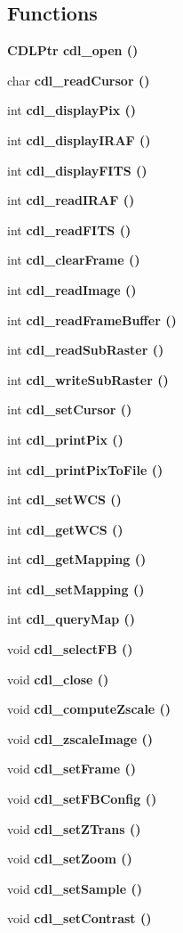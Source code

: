 \subsection*{Functions}
\begin{CompactItemize}
\item 
\bf{CDLPtr} \bf{cdl\_\-open} ()
\item 
char \bf{cdl\_\-read\-Cursor} ()
\item 
int \bf{cdl\_\-display\-Pix} ()
\item 
int \bf{cdl\_\-display\-IRAF} ()
\item 
int \bf{cdl\_\-display\-FITS} ()
\item 
int \bf{cdl\_\-read\-IRAF} ()
\item 
int \bf{cdl\_\-read\-FITS} ()
\item 
int \bf{cdl\_\-clear\-Frame} ()
\item 
int \bf{cdl\_\-read\-Image} ()
\item 
int \bf{cdl\_\-read\-Frame\-Buffer} ()
\item 
int \bf{cdl\_\-read\-Sub\-Raster} ()
\item 
int \bf{cdl\_\-write\-Sub\-Raster} ()
\item 
int \bf{cdl\_\-set\-Cursor} ()
\item 
int \bf{cdl\_\-print\-Pix} ()
\item 
int \bf{cdl\_\-print\-Pix\-To\-File} ()
\item 
int \bf{cdl\_\-set\-WCS} ()
\item 
int \bf{cdl\_\-get\-WCS} ()
\item 
int \bf{cdl\_\-get\-Mapping} ()
\item 
int \bf{cdl\_\-set\-Mapping} ()
\item 
int \bf{cdl\_\-query\-Map} ()
\item 
void \bf{cdl\_\-select\-FB} ()
\item 
void \bf{cdl\_\-close} ()
\item 
void \bf{cdl\_\-compute\-Zscale} ()
\item 
void \bf{cdl\_\-zscale\-Image} ()
\item 
void \bf{cdl\_\-set\-Frame} ()
\item 
void \bf{cdl\_\-set\-FBConfig} ()
\item 
void \bf{cdl\_\-set\-ZTrans} ()
\item 
void \bf{cdl\_\-set\-Zoom} ()
\item 
void \bf{cdl\_\-set\-Sample} ()
\item 
void \bf{cdl\_\-set\-Contrast} ()

\end{CompactItemize}
